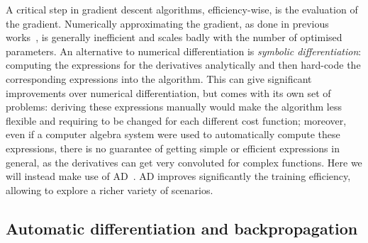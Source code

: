 A critical step in gradient descent algorithms, efficiency-wise, is the evaluation of the gradient.
Numerically approximating the gradient, as done in previous works~\cite{banchi2016quantum}, is generally inefficient and scales badly with the number of optimised parameters.
An alternative to numerical differentiation is \emph{symbolic differentiation}: computing the expressions for the derivatives analytically and then hard-code the corresponding expressions into the algorithm. This can give significant improvements over numerical differentiation, but comes with its own set of problems: deriving these expressions manually would make the algorithm less flexible and requiring to be changed for each different cost function; moreover, even if a computer algebra system were used to automatically compute these expressions, there is no guarantee of getting simple or efficient expressions in general, as the derivatives can get very convoluted for complex functions.
Here we will instead make use of \acf{AD}~\cite{bartholomewbiggs2000automatic,bischof2008advances,baydin2018automatic}.
\ac{AD} improves significantly the training efficiency, allowing to explore a richer variety of scenarios.



\subsection{Automatic differentiation and backpropagation}
\label{subsec:GL:backpropagation}

